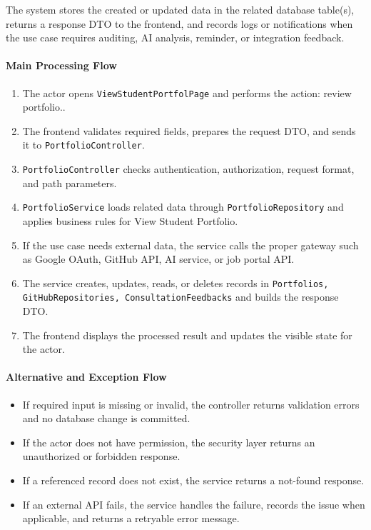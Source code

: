 The system stores the created or updated data in the related database table(s), returns a response DTO to the frontend, and records logs or notifications when the use case requires auditing, AI analysis, reminder, or integration feedback.

\paragraph{Main Processing Flow}

\begin{enumerate}
    \item The actor opens \texttt{ViewStudentPortfolPage} and performs the action: review portfolio..
    \item The frontend validates required fields, prepares the request DTO, and sends it to \texttt{PortfolioController}.
    \item \texttt{PortfolioController} checks authentication, authorization, request format, and path parameters.
    \item \texttt{PortfolioService} loads related data through \texttt{PortfolioRepository} and applies business rules for View Student Portfolio.
    \item If the use case needs external data, the service calls the proper gateway such as Google OAuth, GitHub API, AI service, or job portal API.
    \item The service creates, updates, reads, or deletes records in \texttt{Portfolios, GitHubRepositories, ConsultationFeedbacks} and builds the response DTO.
    \item The frontend displays the processed result and updates the visible state for the actor.
\end{enumerate}

\paragraph{Alternative and Exception Flow}

\begin{itemize}
    \item If required input is missing or invalid, the controller returns validation errors and no database change is committed.
    \item If the actor does not have permission, the security layer returns an unauthorized or forbidden response.
    \item If a referenced record does not exist, the service returns a not-found response.
    \item If an external API fails, the service handles the failure, records the issue when applicable, and returns a retryable error message.
\end{itemize}


